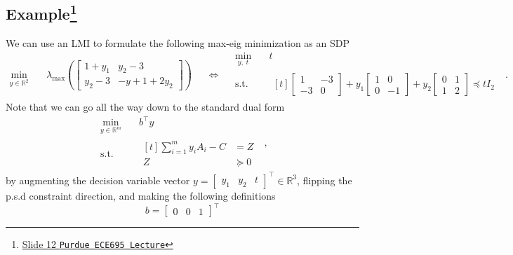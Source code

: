 \documentclass[a4paper]{article}
\begin{document}
\subsection*{Example\footnote{\href{https://engineering.purdue.edu/~jianghai/Teaching/ECE695/Lec_05.pdf}{Slide 12 \texttt{Purdue ECE695 Lecture}}}}
We can use an LMI to formulate the following max-eig minimization as an SDP
\begin{equation*}
\begin{split}
\min_{y\in\mathbb{R}^2}   \quad & \lambda_{\max}\left(\begin{bmatrix}1+y_1 & y_2-3 \\ y_2-3 & -y+1+2y_2\end{bmatrix}\right)
\end{split}
\quad\iff\quad
\begin{split}
\min_{y,\;t}   \quad & t \\
\textrm{s.t.} \quad &
  \begin{aligned}[t]
    \begin{bmatrix}1&-3\\-3&0\end{bmatrix} +
    y_1 \begin{bmatrix}1&0\\0&-1\end{bmatrix} +
    y_2 \begin{bmatrix}0&1\\1&2\end{bmatrix} \preceq tI_2
  \end{aligned}
\end{split}\;.
\end{equation*}
Note that we can go all the way down to the standard dual form
\begin{equation*}
\begin{split}
\min_{y\in\mathbb{R}^m}   \quad & b^\top y \\
\textrm{s.t.} \quad &
  \begin{aligned}[t]
    \sum_{i=1}^m y_i A_i - C &= Z \\
    Z &\succeq 0
  \end{aligned}
\end{split}\;,
\end{equation*}
by augmenting the decision variable vector $y=\begin{bmatrix}y_1 & y_2 & t\end{bmatrix}^\top\in\mathbb{R}^3$, flipping the p.s.d constraint direction, and making the following definitions
\begin{equation*}
b = \begin{bmatrix}0 & 0 & 1\end{bmatrix}^\top
\end{equation*}
\end{document}
